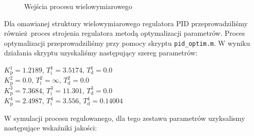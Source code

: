 \begin{figure}
    \begin{subfigure}[b]{\textwidth}
        \centering
    \end{subfigure}
    \caption{Wejścia procesu wielowymiarowego}
    \label{pro_pid_2_in}
\end{figure}
\FloatBarrier

Dla omawianej struktury wielowymiarowego regulatora PID przeprowadziliśmy również proces 
strojenia regulatora metodą optymalizacji parametrów. Proces optymalizacji przeprowadziliśmy
przy pomocy skryptu \verb+pid_optim.m+. W wyniku działania skryptu uzyskaliśmy następujący 
szereg parametrów:\\

\begin{center}
    $K^{\num{1}}_{\mathrm{p}} = \num{1.2189}$, $T^{\num{1}}_{\mathrm{i}} = \num{3.5174}$, $T^{\num{1}}_{\mathrm{d}} = \num{0.0}$ \\
    $K^{\num{2}}_{\mathrm{p}} = \num{0.0}$, $T^{\num{2}}_{\mathrm{i}} = \infty$, $T^{\num{2}}_{\mathrm{d}} = \num{0.0}$ \\
    $K^{\num{3}}_{\mathrm{p}} = \num{7.3684}$, $T^{\num{3}}_{\mathrm{i}} = \num{11.301}$, $T^{\num{3}}_{\mathrm{d}} = \num{0.0}$ \\
    $K^{\num{4}}_{\mathrm{p}} = \num{2.4987}$, $T^{\num{4}}_{\mathrm{i}} = \num{3.556}$, $T^{\num{4}}_{\mathrm{d}} = \num{0.14004}$ \\
\end{center}

W symulacji procesu regulowanego, dla tego zestawu parametrów uzyksalismy następujące wskaźniki jakości:\\

